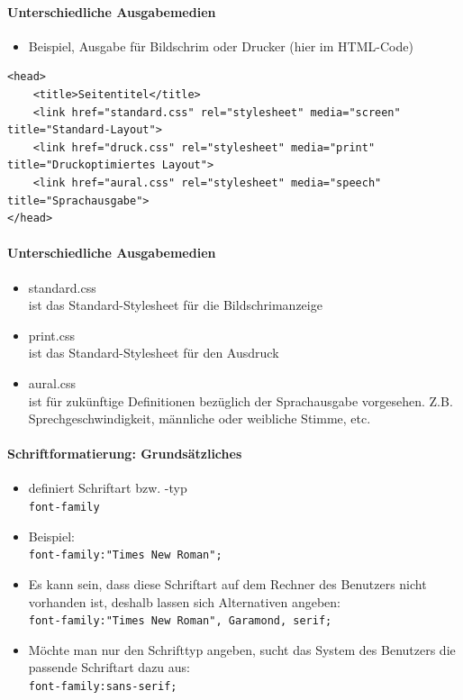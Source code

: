 \documentclass[10pt,a4paper]{article}
\begin{document}
\paragraph{Unterschiedliche Ausgabemedien}
\begin{itemize}[noitemsep,topsep=0pt,leftmargin=*]
    \item Beispiel, Ausgabe für Bildschrim oder Drucker (hier im HTML-Code)
\end{itemize}
\begin{lstlisting}
<head>
    <title>Seitentitel</title>
    <link href="standard.css" rel="stylesheet" media="screen" title="Standard-Layout">
    <link href="druck.css" rel="stylesheet" media="print" title="Druckoptimiertes Layout">
    <link href="aural.css" rel="stylesheet" media="speech" title="Sprachausgabe">
</head>
\end{lstlisting}

\paragraph{Unterschiedliche Ausgabemedien}
\begin{itemize}[noitemsep,topsep=0pt,leftmargin=*]
    \item standard.css\\ist das Standard-Stylesheet für die Bildschrimanzeige
    \item print.css\\ist das Standard-Stylesheet für den Ausdruck
    \item aural.css\\ist für zukünftige Definitionen bezüglich der Sprachausgabe vorgesehen. Z.B. Sprechgeschwindigkeit, männliche oder weibliche Stimme, etc.
\end{itemize}

\paragraph{Schriftformatierung: Grundsätzliches}
\begin{itemize}[noitemsep,topsep=0pt,leftmargin=*]
    \item definiert Schriftart bzw. -typ\\
    \texttt{font-family}
    \item Beispiel:\\
    \verb|font-family:"Times New Roman";|
    \item Es kann sein, dass diese Schriftart auf dem Rechner des Benutzers nicht vorhanden ist, deshalb lassen sich Alternativen angeben:\\
    \verb|font-family:"Times New Roman", Garamond, serif;|
    \item Möchte man nur den Schrifttyp angeben, sucht das System des Benutzers die passende Schriftart dazu aus:\\
    \texttt{font-family:sans-serif;}
\end{itemize}
\end{document}
